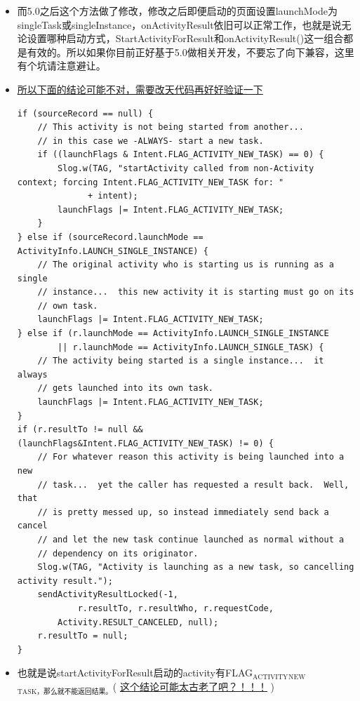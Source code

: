 \documentclass[9pt, b5paaper]{book}
\begin{document}
\begin{itemize}
\item 而5.0之后这个方法做了修改，修改之后即便启动的页面设置launchMode为singleTask或singleInstance，onActivityResult依旧可以正常工作，也就是说无论设置哪种启动方式，StartActivityForResult和onActivityResult()这一组合都是有效的。所以如果你目前正好基于5.0做相关开发，不要忘了向下兼容，这里有个坑请注意避让。
\item \uline{所以下面的结论可能不对，需要改天代码再好好验证一下}
\begin{verbatim}
if (sourceRecord == null) {
    // This activity is not being started from another...  
    // in this case we -ALWAYS- start a new task.
    if ((launchFlags & Intent.FLAG_ACTIVITY_NEW_TASK) == 0) {
        Slog.w(TAG, "startActivity called from non-Activity context; forcing Intent.FLAG_ACTIVITY_NEW_TASK for: "
              + intent);
        launchFlags |= Intent.FLAG_ACTIVITY_NEW_TASK;
    }
} else if (sourceRecord.launchMode == ActivityInfo.LAUNCH_SINGLE_INSTANCE) {
    // The original activity who is starting us is running as a single
    // instance...  this new activity it is starting must go on its
    // own task.
    launchFlags |= Intent.FLAG_ACTIVITY_NEW_TASK;
} else if (r.launchMode == ActivityInfo.LAUNCH_SINGLE_INSTANCE
        || r.launchMode == ActivityInfo.LAUNCH_SINGLE_TASK) {
    // The activity being started is a single instance...  it always
    // gets launched into its own task.
    launchFlags |= Intent.FLAG_ACTIVITY_NEW_TASK;
}
if (r.resultTo != null && (launchFlags&Intent.FLAG_ACTIVITY_NEW_TASK) != 0) {
    // For whatever reason this activity is being launched into a new
    // task...  yet the caller has requested a result back.  Well, that
    // is pretty messed up, so instead immediately send back a cancel
    // and let the new task continue launched as normal without a
    // dependency on its originator.
    Slog.w(TAG, "Activity is launching as a new task, so cancelling activity result.");
    sendActivityResultLocked(-1,
            r.resultTo, r.resultWho, r.requestCode,
        Activity.RESULT_CANCELED, null);
    r.resultTo = null;
}
\end{verbatim}
\item 也就是说startActivityForResult启动的activity有FLAG$_{\text{ACTIVITY}}$$_{\text{NEW}}$$_{\text{TASK，那么就不能返回结果。}}$( \uline{这个结论可能太古老了吧？！！！} )
\end{itemize}
\end{document}
